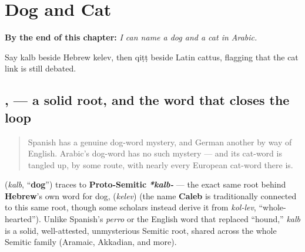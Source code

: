 
\chapter{Dog and Cat}
\label{ch:ar-dog-and-cat}

\begin{chapteropening}
\textbf{By the end of this chapter:} \emph{I can name a dog and a cat in Arabic.}

Say kalb beside Hebrew kelev, then qiṭṭ beside Latin cattus, flagging that the cat link is still debated.
\end{chapteropening}

\section[\texorpdfstring{\ar{كلب}, \ar{قط} (kalb, qiṭṭ)}{كلب, قط (kalb, qiṭṭ)}]{,  — a solid root, and the word that closes the loop}

\label{lesson:AR-C21-kalb-qitt}



\begin{quote}
Spanish has a genuine dog-word mystery, and German another by way of English. Arabic's dog-word has no such mystery — and its cat-word is tangled up, by some route, with nearly every European cat-word there is.
\end{quote}

\begin{culture}
\textbf{} (\emph{kalb}, \textquotedblleft{}\textbf{dog}\textquotedblright{}) traces to \textbf{Proto-Semitic} \emph{\textbf{*kalb-}} — the exact same root behind \textbf{Hebrew}'s own word for dog, \textbf{} (\emph{kelev}) (the name \textbf{Caleb} is traditionally connected to this same root, though some scholars instead derive it from \emph{kol-lev}, \textquotedblleft{}whole-hearted\textquotedblright{}). Unlike Spanish's \emph{perro} or the English word that replaced \textquotedblleft{}hound,\textquotedblright{} \emph{kalb} is a solid, well-attested, unmysterious Semitic root, shared across the whole Semitic family (Aramaic, Akkadian, and more).
\end{culture}

